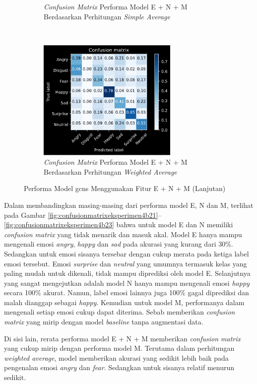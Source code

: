 \begin{figure}[!htb]
\begin{subfigure}[t]{6.75cm}
        \caption{\textit{Confusion Matrix} Performa Model E + N + M Berdasarkan Perhitungan \textit{Simple Average}}
        \label{fig:confusionmatrixeksperimen4b24}
    \end{subfigure}
    ~~~
    \begin{subfigure}[t]{6.75cm}
        \includegraphics[width=6.75cm]{gambar/eksperimen4b2_matriks5.png}
        \caption{\textit{Confusion Matrix} Performa Model E + N + M Berdasarkan Perhitungan \textit{Weighted Average}}
        \label{fig:confusionmatrixeksperimen4b25}
    \end{subfigure}
    \caption{Performa Model \acrshort{gcns} Menggunakan Fitur E + N + M (Lanjutan)}
\end{figure}
Dalam membandingkan masing-masing dari performa model E, N dan M, terlihat pada Gambar \ref{fig:confusionmatrixeksperimen4b21}--\ref{fig:confusionmatrixeksperimen4b23} bahwa untuk model E dan N memiliki \textit{confusion matrix} yang tidak menarik dan masuk akal. Model E hanya mampu mengenali emosi \textit{angry}, \textit{happy} dan \textit{sad} pada akurasi yang kurang dari 30\%. Sedangkan untuk emosi sisanya tersebar dengan cukup merata pada ketiga label emosi tersebut. Emosi \textit{surprise} dan \textit{neutral} yang umumnya termasuk kelas yang paling mudah untuk dikenali, tidak mampu diprediksi oleh model E. Selanjutnya yang sangat mengejutkan adalah model N hanya mampu mengenali emosi \textit{happy} secara 100\% akurat. Namun, label emosi lainnya juga 100\% gagal diprediksi dan malah dianggap sebagai \textit{happy}. Kemudian untuk model M, performanya dalam mengenali setiap emosi cukup dapat diterima. Sebab memberikan \textit{confusion matrix} yang mirip dengan model \textit{baseline} tanpa augmentasi data.

Di sisi lain, rerata performa model E + N + M memberikan \textit{confusion matrix} yang cukup mirip dengan performa model M. Terutama dalam perhitungan \textit{weighted average}, model memberikan akurasi yang sedikit lebih baik pada pengenalan emosi \textit{angry} dan \textit{fear}. Sedangkan untuk sisanya relatif menurun sedikit.

